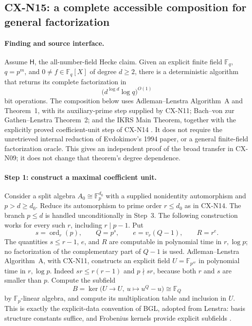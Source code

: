 \documentclass[11pt,a4paper]{article}
\begin{document}
\subsection{CX-N15: a complete accessible composition for general factorization}
\label{finding:CX-N15}

\paragraph{Finding and source interface.}
Assume \(\mathsf H\), the all-number-field Hecke claim.
Given an explicit finite field \(\mathbb F_q\), \(q=p^m\), and
\(0\ne f\in\mathbb F_q[X]\) of degree \(d\geq2\), there is a
deterministic algorithm that returns its complete factorization in
\[
 \bigl(d^{\log d}\log q\bigr)^{O(1)}
\]
bit operations.
The composition below uses Adleman--Lenstra Algorithm~A and
Theorem~1, with its auxiliary-prime step supplied by CX-N11;
Bach--von zur Gathen--Lenstra Theorem~2; and the IKRS Main Theorem,
together with the explicitly proved coefficient-unit step of
CX-N14
\cite{CXNAdlemanLenstra86,CXNBGL01,CXNIKRS08}.
It does not require the unretrieved internal reduction of
Evdokimov's 1994 paper, or a general finite-field factorization
oracle.
This gives an independent proof of the broad transfer in CX-N09;
it does not change that theorem's degree dependence.

\paragraph{Step 1: construct a maximal coefficient unit.}
Consider a split algebra \(A_0\cong\mathbb F_p^{d_0}\) with a
supplied nonidentity automorphism and \(p>d\geq d_0\).
Reduce its automorphism to prime order \(r\leq d_0\) as in
CX-N14. The branch \(p\leq d\) is handled unconditionally in
Step~3. The following construction works for every such \(r\),
including \(r\mid p-1\). Put
\[
 s=\operatorname{ord}_r(p),\qquad Q=p^s,
 \qquad e=v_r(Q-1),\qquad R=r^e.
\]
The quantities \(s\leq r-1\), \(e\), and \(R\) are computable
in polynomial time in \(r,\log p\); no factorization of the
complementary part of \(Q-1\) is used.
Adleman--Lenstra Algorithm~A, with CX-N11, constructs an explicit
field
\(U=\mathbb F_{p^{sr}}\) in polynomial time in \(r,\log p\).
Indeed \(sr\leq r(r-1)\) and \(p\nmid sr\), because both
\(r\) and \(s\) are smaller than \(p\).
Compute the subfield
\[
 B=\ker\bigl(U\longrightarrow U,\ u\longmapsto u^Q-u\bigr)
   \cong\mathbb F_Q
\]
by \(\mathbb F_p\)-linear algebra, and compute its multiplication
table and inclusion in \(U\).
This is exactly the explicit-data convention of BGL, adopted
from Lenstra: basis structure constants suffice, and Frobenius
kernels provide explicit subfields
\cite[p.~329 and \S2, p.~332]{CXNLenstra91}.
\end{document}
